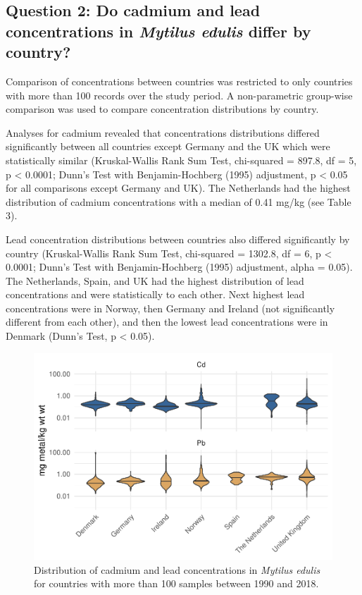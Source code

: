 \documentclass[
  12pt,
]{article}
\begin{document}
\hypertarget{question-2-do-cadmium-and-lead-concentrations-in-mytilus-edulis-differ-by-country}{%
\subsection{\texorpdfstring{Question 2: Do cadmium and lead
concentrations in \emph{Mytilus edulis} differ by
country?}{Question 2: Do cadmium and lead concentrations in Mytilus edulis differ by country?}}\label{question-2-do-cadmium-and-lead-concentrations-in-mytilus-edulis-differ-by-country}}

Comparison of concentrations between countries was restricted to only
countries with more than 100 records over the study period. A
non-parametric group-wise comparison was used to compare concentration
distributions by country.

Analyses for cadmium revealed that concentrations distributions differed
significantly between all countries except Germany and the UK which were
statistically similar (Kruskal-Wallis Rank Sum Test, chi-squared =
897.8, df = 5, p \textless{} 0.0001; Dunn's Test with Benjamin-Hochberg
(1995) adjustment, p \textless{} 0.05 for all comparisons except Germany
and UK). The Netherlands had the highest distribution of cadmium
concentrations with a median of 0.41 mg/kg (see Table 3).

Lead concentration distributions between countries also differed
significantly by country (Kruskal-Wallis Rank Sum Test, chi-squared =
1302.8, df = 6, p \textless{} 0.0001; Dunn's Test with Benjamin-Hochberg
(1995) adjustment, alpha = 0.05). The Netherlands, Spain, and UK had the
highest distribution of lead concentrations and were statistically to
each other. Next highest lead concentrations were in Norway, then
Germany and Ireland (not significantly different from each other), and
then the lowest lead concentrations were in Denmark (Dunn's Test, p
\textless{} 0.05).

\begin{figure}
\centering
\includegraphics{McCrory_ENV972_Project_files/figure-latex/unnamed-chunk-8-1.pdf}
\caption{Distribution of cadmium and lead concentrations in
\emph{Mytilus edulis} for countries with more than 100 samples between
1990 and 2018.}
\end{figure}
\end{document}
